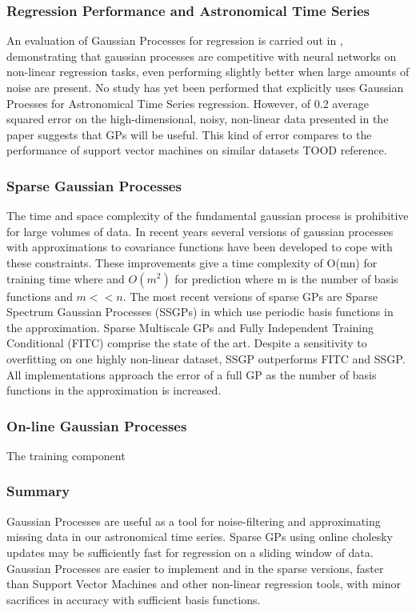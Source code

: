 \documentclass[11pt]{article}
\begin{document}
	\subsubsection{Regression Performance and Astronomical Time Series}
	An evaluation of Gaussian Processes for regression is carried out in \citep{rasmussen1996evaluation}, demonstrating that gaussian processes are competitive with neural networks on non-linear regression tasks, even performing slightly better when large amounts of noise are present. No study has yet been performed that explicitly uses Gaussian Proesses for Astronomical Time Series regression. However, of 0.2 average squared error on the high-dimensional, noisy, non-linear data presented in the paper suggests that GPs will be useful. This kind of error compares to the performance of support vector machines on similar datasets TOOD reference.
	
	\subsubsection{Sparse Gaussian Processes}
	The time and space complexity of the fundamental gaussian process is prohibitive for large volumes of data. In recent years several versions of gaussian processes with approximations to covariance functions have been developed to cope with these constraints. These improvements give a time complexity of O(mn) for training time where and $O(m^{2})$ for prediction where m is the number of basis functions and $m << n$. The most recent versions of sparse GPs are Sparse Spectrum Gaussian Processes (SSGPs) in \citep{rasmussen2010ssgpr} which use periodic basis functions in the approximation. Sparse Multiscale GPs \citep{walder2008sparse} and Fully Independent Training Conditional (FITC) \citep{snelson2005sgppi} comprise the state of the art. Despite a sensitivity to overfitting on one highly non-linear dataset, SSGP outperforms FITC and SSGP. All implementations approach the error of a full GP as the number of basis functions in the approximation is increased.

	\subsubsection{On-line Gaussian Processes}
	The training component 
	
	\subsubsection{Summary}
	Gaussian Processes are useful as a tool for noise-filtering and approximating missing data in our astronomical time series. Sparse GPs using online cholesky updates may be sufficiently fast for regression on a sliding window of data. Gaussian Processes are easier to implement and in the sparse versions, faster than Support Vector Machines and other non-linear regression tools, with minor sacrifices in accuracy with sufficient basis functions.
\end{document}
